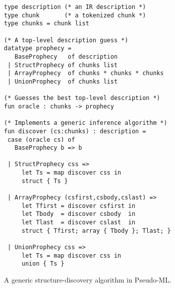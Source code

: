 \begin{figure}
{\small
\begin{verbatim}
type description (* an IR description *)
type chunk       (* a tokenized chunk *)
type chunks = chunk list

(* A top-level description guess *)
datatype prophecy =
   BaseProphecy   of description
 | StructProphecy of chunks list 
 | ArrayProphecy  of chunks * chunks * chunks
 | UnionProphecy  of chunks list

(* Guesses the best top-level description *)
fun oracle : chunks -> prophecy

(* Implements a generic inference algorithm *)
fun discover (cs:chunks) : description =
 case (oracle cs) of
   BaseProphecy b => b

 | StructProphecy css => 
     let Ts = map discover css in
     struct { Ts }

 | ArrayProphecy (csfirst,csbody,cslast) => 
     let Tfirst = discover csfirst in
     let Tbody  = discover csbody  in
     let Tlast  = discover cslast  in
     struct { Tfirst; array { Tbody }; Tlast; }

 | UnionProphecy css => 
     let Ts = map discover css in
     union { Ts }
\end{verbatim}
}
\caption{A generic structure-discovery algorithm in Pseudo-ML.} \shrink
\label{fig:structure-discovery}
\end{figure}
